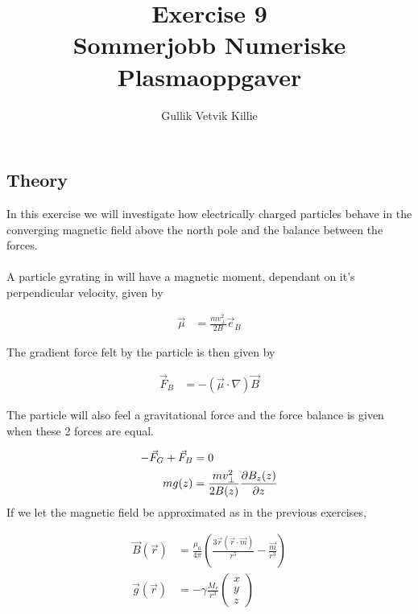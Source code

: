 \documentclass[x11names]{article}
\title{ Exercise 9 \\ Sommerjobb Numeriske Plasmaoppgaver }
\author{Gullik Vetvik Killie
		}
\renewcommand{\va}{\vec}
\begin{document}
\maketitle

\section{}

\subsection{Theory}
  In this exercise we will investigate how electrically charged particles behave in the converging magnetic field above the north pole and the balance between the forces.
\\ \\
  A particle gyrating in will have a magnetic moment, dependant on it's perpendicular velocity, given by

  \begin{align}
    \va{\mu} &= \frac{mv_\perp^2}{2B} \va{e}_B
  \end{align}

  The gradient force felt by the particle is then given by

  \begin{align}
    \va{F}_B &= -\left( \va{\mu}\cdot\nabla \right)\va{B}
  \end{align}

  The particle will also feel a gravitational force and the force balance is given when these 2 forces are equal.

  \begin{align}
    -\va{F}_G + \va{F}_B &= 0  
    \\
    mg(z) &= \frac{mv_\perp^2}{2B(z)} \pdv{B_z(z)}{z}
  \end{align}
  \noindent If we let the magnetic field be approximated as in the previous exercises,

  \begin{align}
    \va{B}(\va{r}) &= \frac{\mu_0}{4\pi}\left( \frac{3\va{r}(\va{r}\cdot\va{m}  )}{r^5} - \frac{\va{m}}{r^3} \right)
    \\
    \va{g}(\va{r}) &= - \gamma \frac{M_e}{r^3}
      \begin{pmatrix}
        x \\ y \\ z
      \end{pmatrix}
  \end{align}
\end{document}
